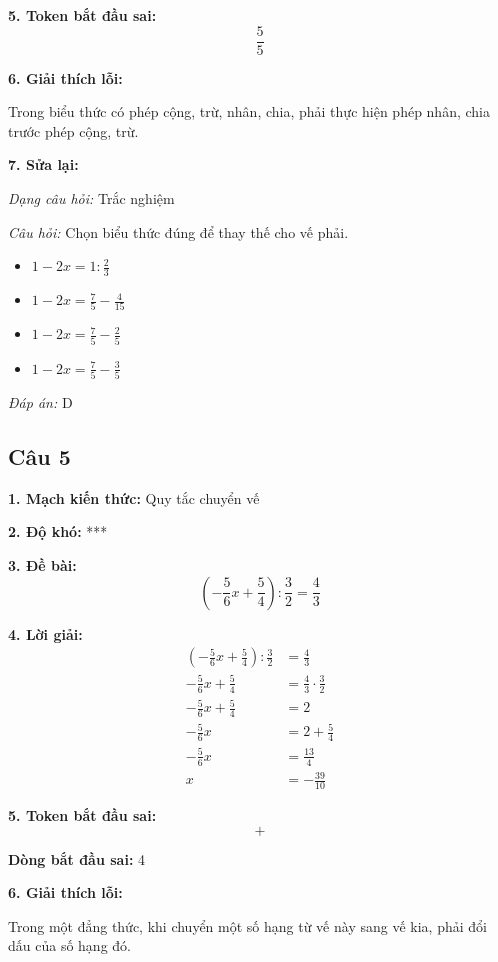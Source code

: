 \noindent\textbf{5. Token bắt đầu sai:}
\[
\frac{5}{5}
\]

\noindent\textbf{6. Giải thích lỗi:}

Trong biểu thức có phép cộng, trừ, nhân, chia, phải thực hiện phép nhân, chia trước phép cộng, trừ.

\noindent\textbf{7. Sửa lại:}

\textit{Dạng câu hỏi:} Trắc nghiệm

\textit{Câu hỏi:} Chọn biểu thức đúng để thay thế cho vế phải.

\begin{itemize}
    \item[A.] $1-2x=1:\frac{2}{3}$
    \item[B.] $1-2x=\frac{7}{5}-\frac{4}{15}$
    \item[C.] $1-2x=\frac{7}{5}-\frac{2}{5}$
    \item[D.] $1-2x=\frac{7}{5}-\frac{3}{5}$
\end{itemize}

\textit{Đáp án:} D

\subsection*{Câu 5}

\noindent\textbf{1. Mạch kiến thức:} Quy tắc chuyển vế

\noindent\textbf{2. Độ khó:} ***

\noindent\textbf{3. Đề bài:}
\[
\left(-\frac{5}{6}x+\frac{5}{4}\right):\frac{3}{2}
=\frac{4}{3}
\]

\noindent\textbf{4. Lời giải:}
\begin{align*}
\left(-\frac{5}{6}x+\frac{5}{4}\right):\frac{3}{2}
    &= \frac{4}{3} \\
-\frac{5}{6}x+\frac{5}{4}
    &= \frac{4}{3}\cdot\frac{3}{2} \\
-\frac{5}{6}x+\frac{5}{4}
    &= 2 \\
-\frac{5}{6}x
    &= 2+\frac{5}{4} \\
-\frac{5}{6}x
    &= \frac{13}{4} \\
x
    &= -\frac{39}{10}
\end{align*}

\noindent\textbf{5. Token bắt đầu sai:}
\[
+
\]

\noindent\textbf{Dòng bắt đầu sai:} 4

\noindent\textbf{6. Giải thích lỗi:}

Trong một đẳng thức, khi chuyển một số hạng từ vế này sang vế kia, phải đổi dấu của số hạng đó.

